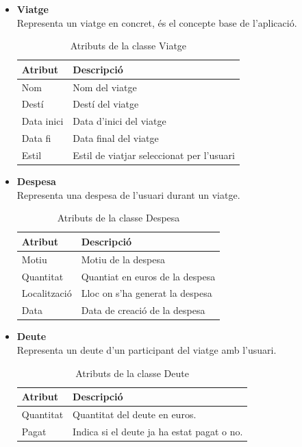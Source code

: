 \begin{itemize}
\item[]\textbf{Viatge}\\
Representa un viatge en concret, és el concepte base de l'aplicació.
\begin{table}[!h]
\begin{tabular}{|M|T|}
\hline
\textbf{Atribut}  & \textbf{Descripció} \\\hline
Nom &  Nom del viatge\\\hline
Destí &  Destí del viatge\\\hline
Data inici &  Data d'inici del viatge\\\hline
Data fi &  Data final del viatge\\\hline
Estil &  Estil de viatjar seleccionat per l'usuari\\\hline
\end{tabular}
\label{}
\caption{Atributs de la classe Viatge}
\end{table}

\clearpage

\item[]\textbf{Despesa}\\
Representa una despesa de l'usuari durant un viatge.

\begin{table}[!h]
\begin{tabular}{|M|T|}
\hline
\textbf{Atribut}  & \textbf{Descripció} \\\hline
Motiu &  Motiu de la despesa\\\hline
Quantitat &  Quantiat en euros de la despesa\\\hline
Localització &  Lloc on s'ha generat la despesa\\\hline
Data &  Data de creació de la despesa\\\hline
\end{tabular}
\label{}
\caption{Atributs de la classe Despesa}
\end{table}


\item[]\textbf{Deute}\\
Representa un deute d'un participant del viatge amb l'usuari.

\begin{table}[!h]
\begin{tabular}{|M|T|}
\hline
\textbf{Atribut}  & \textbf{Descripció} \\\hline
Quantitat & Quantitat del deute en euros.\\\hline
Pagat &  Indica si el deute ja ha estat pagat o no.\\\hline
\end{tabular}
\label{}
\caption{Atributs de la classe Deute}
\end{table}



\end{itemize}
